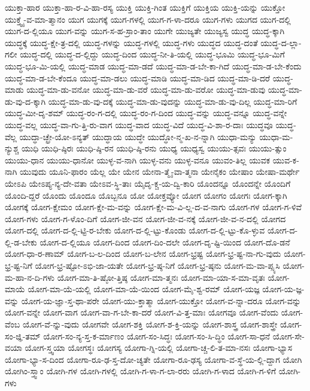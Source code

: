 {ಯುಕ್ತಾ-ಹಾರ
ಯುಕ್ತಾ-ಹಾ-ರ-ವಿ-ಹಾ-ರಸ್ಯ
ಯುಕ್ತಿ
ಯುಕ್ತಿ-ಗಿಂತ
ಯುಕ್ತಿಗೆ
ಯುಕ್ತಿಯ
ಯುಕ್ತಿ-ಯನ್ನು
ಯುಕ್ತೋ
ಯುಕ್ತ್ವೈ-ವ-ಮಾ-ತ್ಮಾನಂ
ಯುಗ
ಯುಗಕ್ಕೆ
ಯುಗ-ಗಳಲ್ಲಿ
ಯುಗ-ಗ-ಳಾ-ದರೂ
ಯುಗ-ಗಳು
ಯುಗದ
ಯುಗ-ದಲ್ಲಿ
ಯುಗ-ದ-ಲ್ಲಿಯೂ
ಯುಗ-ವನ್ನು
ಯುಗ-ಸ-ಹ-ಸ್ರಾಂ-ತಾಂ
ಯುಗೇ
ಯುಜ್ಯತೇ
ಯುಜ್ಯಸ್ವ
ಯುದ್ಧ
ಯುದ್ಧ-ಕ್ಕಾಗಿ
ಯುದ್ಧಕ್ಕೆ
ಯುದ್ಧ-ಕ್ಷೇ-ತ್ರ-ದಲ್ಲಿ
ಯುದ್ಧ-ಗಳನ್ನು
ಯುದ್ಧ-ಗಳಲ್ಲಿ
ಯುದ್ಧ-ಗಳು
ಯುದ್ಧದ
ಯುದ್ಧ-ದಂತೆ
ಯುದ್ಧ-ದ-ಲ್ಲಾ-ಗಲೀ
ಯುದ್ಧ-ದಲ್ಲಿ
ಯುದ್ಧ-ದ-ಲ್ಲಿದ್ದು
ಯುದ್ಧ-ದಿಂದ
ಯುದ್ಧ-ನೀ-ತಿ-ಯಲ್ಲಿ
ಯುದ್ಧ-ಭೂಮಿ
ಯುದ್ಧ-ಭೂ-ಮಿಗೆ
ಯುದ್ಧ-ಭೂ-ಮಿ-ಯಲ್ಲಿ
ಯುದ್ಧ-ಮಾಡ
ಯುದ್ಧ-ಮಾ-ಡದೆ
ಯುದ್ಧ-ಮಾ-ಡ-ಬೇ-ಕಾ-ಗಿದೆ
ಯುದ್ಧ-ಮಾ-ಡ-ಬೇ-ಕೆಂದು
ಯುದ್ಧ-ಮಾ-ಡ-ಬೇ-ಕೆಂದೂ
ಯುದ್ಧ-ಮಾ-ಡಲು
ಯುದ್ಧ-ಮಾಡಿ
ಯುದ್ಧ-ಮಾ-ಡಿದ
ಯುದ್ಧ-ಮಾ-ಡಿ-ದರೆ
ಯುದ್ಧ-ಮಾಡು
ಯುದ್ಧ-ಮಾ-ಡು-ವನೋ
ಯುದ್ಧ-ಮಾ-ಡು-ವರೆ
ಯುದ್ಧ-ಮಾ-ಡು-ವರೋ
ಯುದ್ಧ-ಮಾ-ಡುವು
ಯುದ್ಧ-ಮಾ-ಡು-ವು-ದ-ಕ್ಕಾಗಿ
ಯುದ್ಧ-ಮಾ-ಡು-ವು-ದಕ್ಕೆ
ಯುದ್ಧ-ಮಾ-ಡು-ವುದನ್ನು
ಯುದ್ಧ-ಮಾ-ಡು-ವು-ದಿಲ್ಲ
ಯುದ್ಧ-ಮಾ-ರಿಗೆ
ಯುದ್ಧ-ಮೀ-ದೃ-ಶಮ್
ಯುದ್ಧ-ರಂ-ಗ-ದಲ್ಲಿ
ಯುದ್ಧ-ರಂ-ಗ-ದಿಂದ
ಯುದ್ಧ-ವನ್ನು
ಯುದ್ಧ-ವನ್ನೂ
ಯುದ್ಧ-ವನ್ನೇ
ಯುದ್ಧ-ವಲ್ಲ
ಯುದ್ಧ-ವಾ-ಗು-ತ್ತಿ-ರು-ವಾಗ
ಯುದ್ಧ-ವಾದ
ಯುದ್ಧ-ವಿದೆ
ಯುದ್ಧ-ವಿ-ಶಾ-ರ-ದಾಃ
ಯುದ್ಧವೂ
ಯುದ್ಧ-ವೆಲ್ಲ
ಯುದ್ಧಾ-ಚ್ಛ್ರೇ-ಯೋ-ಽನ್ಯತ್
ಯುದ್ಧಾಯ
ಯುದ್ಧೇ
ಯುದ್ಧೋ-ನ್ಮ-ಖ-ನ-ನ್ನಾಗಿ
ಯುಧಾ-ಮನ್ಯು
ಯುಧಾ-ಮ-ನ್ಯುಶ್ಚ
ಯುಧಿ
ಯುಧಿ-ಷ್ಠಿರಃ
ಯುಧಿ-ಷ್ಠಿ-ರನ
ಯುಧಿ-ಷ್ಠಿ-ರನು
ಯುಧ್ಯ
ಯುಧ್ಯಸ್ವ
ಯುಯು-ತ್ಸವಃ
ಯುಯು-ತ್ಸುಂ
ಯುಯು-ಧಾನ
ಯುಯು-ಧಾನೋ
ಯುಳ್ಳ-ವ-ನಾಗಿ
ಯುಳ್ಳ-ವನು
ಯುಳ್ಳ-ವನೂ
ಯುವಂ-ತಿಲ್ಲ
ಯುವಕ
ಯುವ-ಕ-ನಾಗಿ
ಯುವುದು
ಯೂನಿ-ಫಾರಂ
ಯೆಲ್ಲ
ಯೇ
ಯೇನ
ಯೇನಾ-ತ್ಮೈ-ವಾ-ತ್ಮನಾ
ಯೇನೈಕಂ
ಯೇಷಾಂ
ಯೇಷಾ-ಮರ್ಥೇ
ಯೇಽಪಿ
ಯೇಽಪ್ಯ-ನ್ಯ-ದೇ-ವತಾ
ಯೇಽವ-ಸ್ಥಿ-ತಾಃ
ಯೈದೃ-ಕ್ಚ-ಯ-ದ್ವಿ-ಕಾರಿ
ಯೊಂದನ್ನೂ
ಯೊಂದನ್ನೇ
ಯೊಂದಿಗೆ
ಯೊಂದಿ-ದ್ದರೆ
ಯೊಂದು
ಯೊಂದೂ
ಯೊಬ್ಬನೂ
ಯೋ
ಯೋಕ್ತವ್ಯೋ
ಯೋಗ
ಯೋಗಂ
ಯೋಗಃ
ಯೋಗ-ಕ್ಕಾಗಿ
ಯೋಗಕ್ಕೆ
ಯೋಗ-ಕ್ಷೇಮಂ
ಯೋಗ-ಕ್ಷೇ-ಮ-ವನ್ನು
ಯೋಗ-ಕ್ಷೇ-ಮ-ವಿ-ಲ್ಲ-ದ-ವ-ನಾಗು
ಯೋಗ-ಗಳ
ಯೋಗ-ಗ-ಳಿವೆ
ಯೋಗ-ಗಳು
ಯೋಗ-ಗ-ಳೊಂ-ದಿಗೆ
ಯೋಗ-ಜೀ-ವನ
ಯೋಗ-ಜೀ-ವ-ನಕ್ಕೆ
ಯೋಗ-ಜೀ-ವ-ನ-ದಲ್ಲಿ
ಯೋಗದ
ಯೋಗ-ದಲ್ಲಿ
ಯೋಗ-ದ-ಲ್ಲಿ-ಟ್ಟಿ-ರ-ಬೇಕು
ಯೋಗ-ದ-ಲ್ಲಿ-ಟ್ಟು-ಕೊಂಡು
ಯೋಗ-ದ-ಲ್ಲಿ-ಟ್ಟು-ಕೊ-ಳ್ಳುವ
ಯೋಗ-ದ-ಲ್ಲಿ-ಡ-ಬೇಕು
ಯೋಗ-ದ-ಲ್ಲಿಯೂ
ಯೋಗ-ದಿಂದ
ಯೋಗ-ದಿಂ-ದಲೇ
ಯೋಗ-ದೃ-ಷ್ಟಿ-ಯಿಂದ
ಯೋಗ-ದೊ-ಡನೆ
ಯೋಗ-ಧಾ-ರ-ಣಾಮ್
ಯೋಗ-ಬ-ಲ-ದಿಂದ
ಯೋಗ-ಬ-ಲೇನ
ಯೋಗ-ಭ್ರಷ್ಟ
ಯೋಗ-ಭ್ರ-ಷ್ಟ-ನಾ-ಗು-ವುದು
ಯೋಗ-ಭ್ರ-ಷ್ಟ-ನಿಗೆ
ಯೋಗ-ಭ್ರ-ಷ್ಟೋ-ಽಭಿ-ಜಾ-ಯತೇ
ಯೋಗ-ಭ್ರ-ಷ್ಠ-ನಿಗೆ
ಯೋಗ-ಭ್ರ-ಷ್ಠನು
ಯೋಗ-ಮ-ವಾ-ಪ್ಸ್ಯಸಿ
ಯೋಗ-ಮ-ಹಾ-ನ-ದಿ-ಗಳು
ಯೋಗ-ಮಾ-ತಿ-ಷ್ಠೋ-ತ್ತಿಷ್ಠ
ಯೋಗ-ಮಾ-ತ್ಮನಃ
ಯೋಗ-ಮಾ-ಯಾ-ಸ-ಮಾ-ವೃತಃ
ಯೋಗ-ಮಾಯೆ
ಯೋಗ-ಮಾ-ಯೆ-ಯಲ್ಲಿ
ಯೋಗ-ಮಾ-ಯೆ-ಯಿಂದ
ಯೋಗ-ಮೈ-ಶ್ವ-ರಮ್
ಯೋಗ-ಯಜ್ಞ
ಯೋಗ-ಯ-ಜ್ಞ-ವನ್ನು
ಯೋಗ-ಯ-ಜ್ಞಾ-ಸ್ತ-ಥಾ-ಪರೇ
ಯೋಗ-ಯು-ಕ್ತಾತ್ಮಾ
ಯೋಗ-ಯುಕ್ತೋ
ಯೋಗ-ವ-ನ್ನಾ-ದರೂ
ಯೋಗ-ವನ್ನು
ಯೋಗ-ವನ್ನೇ
ಯೋಗ-ವಾಗ
ಯೋಗ-ವಾ-ಗ-ಬೇ-ಕಾ-ದರೆ
ಯೋಗ-ವಿ-ತ್ತ-ಮಾಃ
ಯೋಗವೂ
ಯೋಗ-ವೆಂದು
ಯೋಗ-ವೆಂಬ
ಯೋಗ-ವೆ-ನ್ನು-ವುದು
ಯೋಗವೇ
ಯೋಗ-ಶಕ್ತಿ
ಯೋಗ-ಶ-ಕ್ತಿ-ಯನ್ನು
ಯೋಗ-ಶಾಸ್ತ್ರ
ಯೋಗ-ಶಾಸ್ತ್ರೇ
ಯೋಗ-ಸಂ-ಜ್ಞಿ-ತಮ್
ಯೋಗ-ಸಂ-ನ್ಯ-ಸ್ತ-ಕ-ರ್ಮಾಣಂ
ಯೋಗ-ಸಂ-ಸಿದ್ಧಃ
ಯೋಗ-ಸಂ-ಸಿ-ದ್ಧಿಂ
ಯೋಗ-ಸಾ-ಧನೆ
ಯೋಗ-ಸೇ-ವಯಾ
ಯೋಗ-ಸ್ತ್ವಯಾ
ಯೋಗಸ್ಥಃ
ಯೋಗಸ್ಯ
ಯೋಗಾ-ಗ್ನಿ-ಯಲ್ಲಿ
ಯೋಗಾ-ಚ್ಚ-ಲಿ-ತ-ಮಾ-ನಸಃ
ಯೋಗಾ-ಭ್ಯಾಸ
ಯೋಗಾ-ಭ್ಯಾ-ಸ-ದಿಂದ
ಯೋಗಾ-ರೂ-ಢ-ಸ್ತ-ದೋ-ಚ್ಯತೇ
ಯೋಗಾ-ರೂ-ಢಸ್ಯ
ಯೋಗಾ-ವ-ಸ್ಥೆ-ಯ-ಲ್ಲಿ-ದ್ದಾಗ
ಯೋಗಿ
ಯೋಗಿಂ-ಸ್ತ್ವಾಂ
ಯೋಗಿ-ಗಳ
ಯೋಗಿ-ಗಳಲ್ಲಿ
ಯೋಗಿ-ಗ-ಳಾ-ಗ-ಲಾ-ರರು
ಯೋಗಿ-ಗ-ಳಾದ
ಯೋಗಿ-ಗ-ಳಿಗೆ
ಯೋಗಿ-ಗಳು
}
